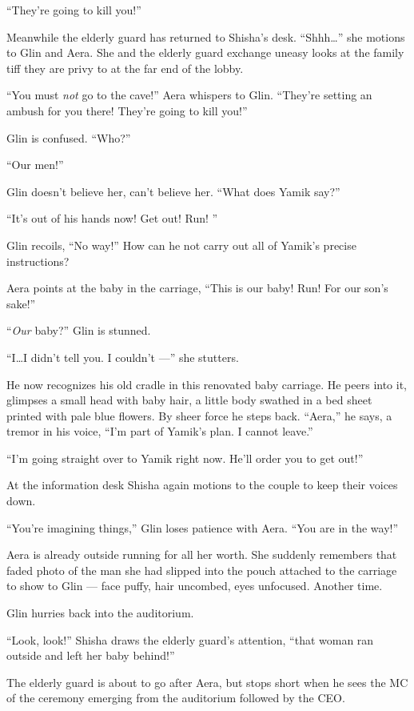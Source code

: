\documentclass[twoside,11pt,openany]{book}
\begin{document}
``They're going to kill you!''

Meanwhile the elderly guard has returned to Shisha's desk. ``Shhh{\ldots}'' she motions to Glin
and Aera. She and the elderly guard exchange{ u}neasy looks at the family tiff
they are privy to at the far end of the lobby.\textbf{ }

``You must \textit{not} go to the cave!'' Aera whispers to Glin.
``They're setting an ambush for you there! They're going to kill you!''

Glin is confused. ``Who?''

``Our men!''

Glin doesn't believe her, can't believe her.  ``What does Yamik say?''

``It's out of his hands now! Get out! Run! ''

Glin recoils, ``No way!'' How can he not carry out all of Yamik's precise instructions?

Aera points at the baby in the carriage, ``This is our baby! Run! For our son's sake!''

``\textit{Our }baby?'' Glin is stunned.

``I{\ldots}I didn't tell you. I couldn't ---'' she stutters.

He now recognizes his old cradle in this renovated baby carriage.
He peers into it, glimpses a small head with baby hair, a little body
swathed in a bed sheet printed with pale blue flowers. By sheer force he steps back.
``Aera,'' he says, a tremor in his voice, ``I'm part of Yamik's plan. I cannot
leave.''

``I'm going straight over to Yamik right now. He'll order you to get out!''

At the information desk Shisha again motions to the couple to keep their voices down.

``You're imagining things,'' Glin loses patience with Aera. ``You are in the
way!''

Aera is already outside running for all her worth. She suddenly remembers that faded photo of the man she had slipped
into the pouch attached to the carriage to show to Glin --- face puffy, hair uncombed, eyes unfocused. Another
time.

Glin hurries back into the auditorium.

``Look, look!'' Shisha draws the elderly guard's attention, ``that woman ran
outside and left her baby behind!''

The elderly guard is about to go after Aera, but stops short when he sees the MC of the ceremony emerging from the
auditorium followed by the CEO.
\end{document}
